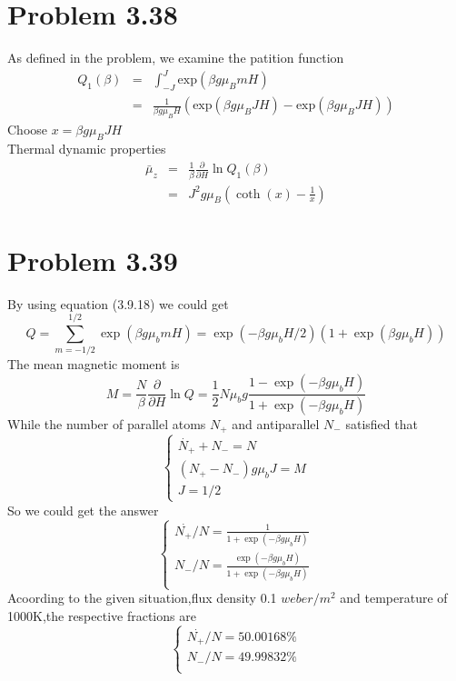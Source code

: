 \documentclass{article}
\begin{document}
\section*{Problem 3.38}
As defined in the problem, we examine the patition function
\begin{eqnarray*}
Q_1(\beta)&=&\int_{-J}^J\mathrm{exp}(\beta g \mu_BmH)\\
&=&\frac{1}{\beta g \mu_BH}(\mathrm{exp}(\beta g \mu_BJH)-\mathrm{exp}(\beta g \mu_B JH))
\end{eqnarray*}
Choose $x=\beta g \mu_BJH$\\
Thermal dynamic properties
\begin{eqnarray*}
\bar{\mu}_z&=&\frac{1}{\beta}\frac{\partial}{\partial H}\ln Q_1(\beta)\\
&=&J^2g\mu_B(\coth (x)-\frac{1}{x})
\end{eqnarray*}

\section*{Problem 3.39}
	By using equation (3.9.18) we could get
	\begin{equation*}
		Q=\sum_{m=-1/2}^{1/2}\exp(\beta g \mu_b mH)=\exp(-\beta g \mu_b H/2)(1+\exp(\beta g \mu_b H))
	\end{equation*}
	The mean magnetic moment is
	\begin{equation*}
		M=\frac{N}{\beta}\frac{\partial}{\partial H}\ln Q=\frac{1}{2}N\mu_b g\frac{1-\exp(-\beta g \mu_b H)}{1+\exp(-\beta g \mu_b H)}
	\end{equation*}
	While the number of parallel atoms $N_+$ and antiparallel $N_-$ satisfied that
	\begin{equation}
		\left\{
		\begin{aligned}
		\overset{.} N_+ +N_- =N\\
		(N_+ -N_-) g \mu_b J =M\\
		J=1/2
		\end{aligned}
		\right.
	\end{equation}
	So we could get the answer
	\begin{equation}
		\left\{
		\begin{aligned}
		\overset{.} 
		{N_+}/{N}=\frac{1}{1+\exp(-\beta g \mu_b H)}\\
		{N_-}/{N} =\frac{\exp(-\beta g \mu_b H)}{1+\exp(-\beta g \mu_b H)}\\
		\end{aligned}
		\right.
	\end{equation}
	Acoording to the given situation,flux density 0.1 $weber/m^2$ and temperature of 1000K,the respective fractions are
	\begin{equation}
		\left\{
		\begin{aligned}
		\overset{.} 
		{N_+}/{N}=50.00168\%\\
		{N_-}/{N} =49.99832\%\\
		\end{aligned}
		\right.
	\end{equation}
	
\end{document}
